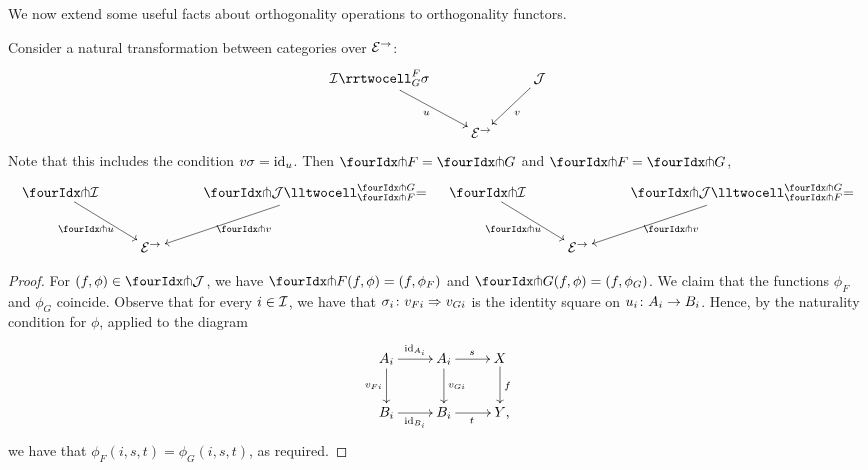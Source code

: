 \documentclass[reqno,10pt,a4paper,oneside,draft]{amsart}
\begin{document}
We now extend some useful facts about orthogonality operations to orthogonality functors.

\begin{proposition} \label{thm:orth-nat}
Consider a natural transformation between categories over $\catE^\to$:
\[
\xymatrix{
  \cal{I}
  \rrtwocell_G^F{\sigma}
 \ar[dr]_{u}
&&
  \cal{J}
  \ar[dl]^{v}
\\&
  \catE^\to
}
\]
Note that this includes the condition $v \sigma = \id_u$.
Then $\liftr{F} = \liftr{G}$ and $\liftl{F} = \liftl{G}$, 
\begin{align*}
\xymatrix{
  \liftr{\cal{I}}
  \ar[dr]_{\liftr{u}}
&&
  \liftr{\cal{J}}
  \lltwocell_{\liftr{F}}^{\liftr{G}}{=}
  \ar[dl]^{\liftr{v}}
\\&
  \catE^\to
}
&&
\xymatrix{
  \liftl{\cal{I}}
  \ar[dr]_{\liftl{u}}
&&
  \liftl{\cal{J}}
  \lltwocell_{\liftl{F}}^{\liftl{G}}{=}
  \ar[dl]^{\liftl{v}}
\\&
  \catE^\to
}
\end{align*}
\end{proposition}

\begin{proof}
For $(f, \phi) \in \liftr{\cal{J}}$, we have $\liftr{F}(f, \phi) = (f, \phi_F)$ and $\liftr{G}(f, \phi) = (f, \phi_G)$.
We claim that the functions $\phi_F$ and $\phi_G$ coincide.
Observe that for every $i \in \cal{I}$, we have that $\sigma_i \co v_{Fi} \Rightarrow v_{Gi}$ is the identity square on $u_i \co A_i \to B_i$.
Hence, by the naturality condition for $\phi$, applied to the diagram
\[
\xymatrix{
  A_i \ar[r]^{\id_{A_i}} \ar[d]_{v_{Fi}} & A_i \ar[d]^{v_{Gi}} \ar[r]^{s} & X \ar[d]^{f} \\
  B_i \ar[r]_{\id_{B_i}} & B_i \ar[r]_{t} & Y
\rlap{,}}
\]
we have that $\phi_F(i, s, t) = \phi_G(i, s, t)$, as required.
\end{proof}

\end{document}
